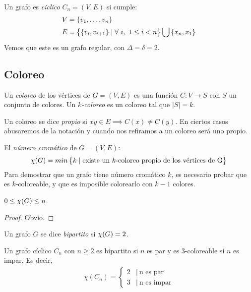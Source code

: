 \begin{definition}
Un grafo es \emph{ciclico} $C_n = (V,E)$ si cumple:
\begin{align}
    V &= \left\{v_1,\mathellipsis,v_n\right\}\\
    E &= \left\{ \left\{v_i,v_{i+1}\right\} \mid \forall~i,~ 1 \le i < n\right\} \bigcup \left\{x_n,x_1\right\}\\
\end{align}
Vemos que este es un grafo regular, con $\Delta = \delta = 2$.
\end{definition}

\subsection{Coloreo}
\begin{definition}
Un \emph{coloreo} de los vértices de $G = (V,E)$ es una función $C \colon V \to S$ con $S$ un conjunto de colores. Un \emph{$k$-coloreo} es un coloreo tal que $|S| = k$.
\end{definition}

\begin{definition}
Un coloreo se dice \emph{propio} si $xy \in E \implies C(x) \neq C(y)$. En ciertos casos abusaremos de la notación y cuando nos refiramos a un coloreo será uno propio.
\end{definition}

\begin{definition}
El \emph{número cromático} de $G = (V,E)$:
\begin{align}
    \chi(G) = min\left\{k \mid \text{existe un $k$-coloreo propio de los vértices de G}\right\}
\end{align}
Para demostrar que un grafo tiene número cromático $k$, es necesario probar que es $k$-coloreable, y que es imposible colorearlo con $k-1$ colores.
\end{definition}

\begin{proposition}
$0 \le \chi(G)\le n$.
\end{proposition}
\begin{proof}
Obvio.
\end{proof}

\begin{definition}
Un grafo $G$ se dice \emph{bipartito} si $\chi(G) = 2$.
\end{definition}

\begin{proposition}\label{graph_cyclic_color}
Un grafo cíclico $C_n$ con $n \ge 2$ es bipartito si $n$ es par y es $3$-coloreable si $n$ es impar. Es decir,
\begin{align}
    \chi(C_n) = 
    \begin{cases}
                2 & |\ \text{n es par} \\
                3 & |\ \text{n es impar}
    \end{cases}
\end{align}
\end{proposition}


